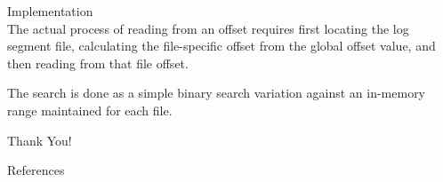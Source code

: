 \begin{frame}[plain,t]{Implementation} %
     \\
    \vspace{2ex}
   The actual process of reading from an offset requires first locating the log segment file, calculating the file-specific offset from the global offset value, and then reading from that file offset. 
   
   \vspace{2ex}
   The search is done as a simple binary search variation against an in-memory range maintained for each file.
    
    
\end{frame}


\begin{frame}[plain]
    \huge
    \vfill
    \centerline{  }
    \vfill
    
\end{frame}
\begin{frame}[plain]
    \huge
    \vfill
    \centerline{  }
    \vfill
    \Huge
    \centerline{\alert{Thank You!} }
    \vfill
\end{frame}

\begin{frame}{References}
\end{frame}  
 
%	

